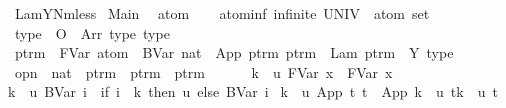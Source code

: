 %
\begin{isabellebody}%
%
%
\isamarkuptrue%
%
\isadelimtheory
%
\endisadelimtheory
%
\isatagtheory
{}\isamarkupfalse%
\ LamYNmless\isanewline
{}\ Main\ %
\endisatagtheory
{\isafoldtheory}%
%
\isadelimtheory
%
\endisadelimtheory
%
\isamarkuptrue%
\isamarkupfalse%
\ atom\isanewline
\isanewline
{}\isamarkupfalse%
\ \isanewline
\ \ atom{\isacharunderscore}inf{\isacharcolon}\ {\isachardoublequoteopen}infinite\ {\isacharparenleft}UNIV\ {\isacharcolon}{\isacharcolon}\ atom\ set{\isacharparenright}{\isachardoublequoteclose}\isanewline
\isanewline
{}\isamarkupfalse%
\ type\ {\isacharequal}\ O\ {\isacharbar}\ Arr\ type\ type\ {\isacharparenleft}{\isachardoublequoteopen}{\isacharunderscore}\ {\isasymrightarrow}\ {\isacharunderscore}{\isachardoublequoteclose}{\isacharparenright}\isanewline
\isanewline
{}\isamarkupfalse%
\ ptrm\ {\isacharequal}\ FVar\ atom\ {\isacharbar}\ BVar\ nat\ {\isacharbar}\ App\ ptrm\ ptrm\ {\isacharbar}\ Lam\ ptrm\ {\isacharbar}\ Y\ type%
\isamarkuptrue%
\isamarkupfalse%
\ opn\ {\isacharcolon}{\isacharcolon}\ {\isachardoublequoteopen}nat\ {\isasymRightarrow}\ ptrm\ {\isasymRightarrow}\ ptrm\ {\isasymRightarrow}\ ptrm{\isachardoublequoteclose}\ {\isacharparenleft}{\isachardoublequoteopen}{\isacharbraceleft}{\isacharunderscore}\ {\isasymrightarrow}\ {\isacharunderscore}{\isacharbraceright}\ {\isacharunderscore}{\isachardoublequoteclose}{\isacharparenright}\ \ \isanewline
{\isachardoublequoteopen}{\isacharbraceleft}k\ {\isasymrightarrow}\ u{\isacharbraceright}\ {\isacharparenleft}FVar\ x{\isacharparenright}\ {\isacharequal}\ FVar\ x{\isachardoublequoteclose}\ {\isacharbar}\isanewline
{\isachardoublequoteopen}{\isacharbraceleft}k\ {\isasymrightarrow}\ u{\isacharbraceright}\ {\isacharparenleft}BVar\ i{\isacharparenright}\ {\isacharequal}\ {\isacharparenleft}if\ i\ {\isacharequal}\ k\ then\ u\ else\ BVar\ i{\isacharparenright}{\isachardoublequoteclose}\ {\isacharbar}\isanewline
{\isachardoublequoteopen}{\isacharbraceleft}k\ {\isasymrightarrow}\ u{\isacharbraceright}\ {\isacharparenleft}App\ t{}\ t{}{\isacharparenright}\ {\isacharequal}\ App\ {\isacharparenleft}{\isacharbraceleft}k\ {\isasymrightarrow}\ u{\isacharbraceright}\ t{}{\isacharparenright}{\isacharparenleft}{\isacharbraceleft}k\ {\isasymrightarrow}\ u{\isacharbraceright}\ t{}{\isacharparenright}{\isachardoublequoteclose}\ {\isacharbar}\isanewline

\end{isabellebody}
